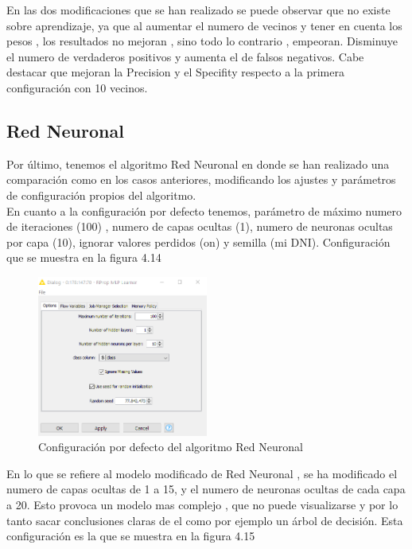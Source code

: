 	En las dos modificaciones que se han realizado se puede observar que no existe sobre aprendizaje, ya que al aumentar el numero de vecinos y tener en cuenta los pesos , los resultados no mejoran , sino todo lo contrario , empeoran. Disminuye el numero de verdaderos positivos y aumenta el de falsos negativos. Cabe destacar que mejoran la Precision y el Specifity respecto a la primera configuración con 10 vecinos.
	
	
	\subsection{Red Neuronal}
	
	Por último, tenemos el algoritmo Red Neuronal en donde se han realizado una comparación como en los casos anteriores, modificando los ajustes y parámetros de configuración propios del algoritmo. \\
	
	En cuanto a la configuración por defecto tenemos, parámetro de máximo numero de iteraciones (100) , numero de capas ocultas (1), numero de neuronas ocultas por capa (10), ignorar valores perdidos (on) y semilla (mi DNI). Configuración que se muestra en la figura 4.14
	
	\begin{figure}[htb]
		\centering
		\includegraphics[width=0.5\textwidth]{./imagenes/53}
		\caption{Configuración por defecto del algoritmo Red Neuronal} \label{fig:1}
	\end{figure}
	
	En lo que se refiere al modelo modificado de Red Neuronal , se ha modificado el numero de capas ocultas de 1 a 15, y el numero de neuronas ocultas de cada capa a 20. Esto provoca un modelo mas complejo , que no puede visualizarse y por lo tanto sacar conclusiones claras de el como por ejemplo un árbol de decisión. Esta configuración es la que se muestra en la figura 4.15
	

